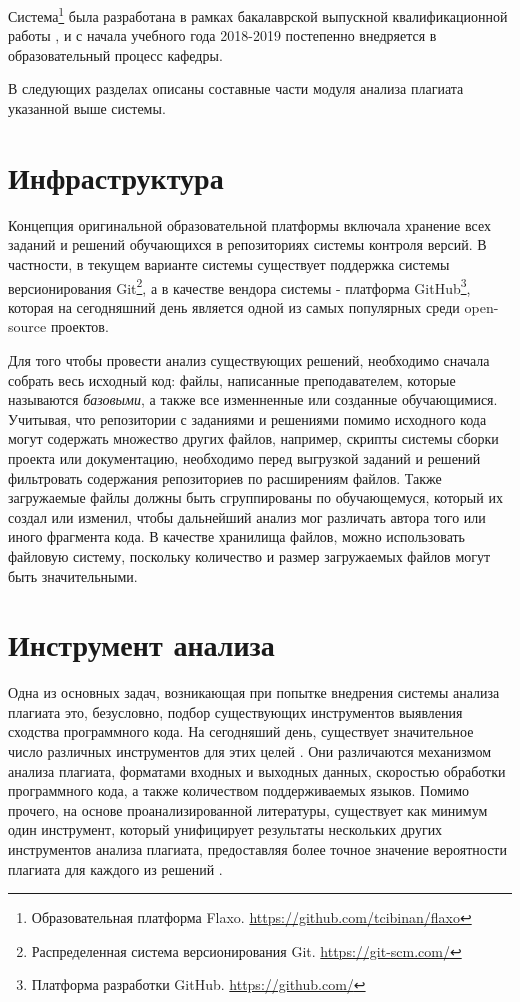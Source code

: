 \documentclass[a4paper,14pt]{extarticle}
\begin{document}
Система\footnote{Образовательная платформа Flaxo. \url{https://github.com/tcibinan/flaxo}} была разработана в рамках бакалаврской выпускной квалификационной работы \citep{flaxoThesis}, и с начала учебного года 2018-2019 постепенно внедряется в образовательный процесс кафедры.

В следующих разделах описаны составные части модуля анализа плагиата указанной выше системы.

\section{Инфраструктура}

Концепция оригинальной образовательной платформы включала хранение всех заданий и решений обучающихся в репозиториях системы контроля версий. В частности, в текущем варианте системы существует поддержка системы версионирования Git\footnote{Распределенная система версионирования Git. \url{https://git-scm.com/}}, а в качестве вендора системы - платформа GitHub\footnote{Платформа разработки GitHub. \url{https://github.com/}}, которая на сегодняшний день является одной из самых популярных среди open-source проектов.

Для того чтобы провести анализ существующих решений, необходимо сначала собрать весь исходный код: файлы, написанные преподавателем, которые называются \textit{базовыми}, а также все изменненные или созданные обучающимися. Учитывая, что репозитории с заданиями и решениями помимо исходного кода могут содержать множество других файлов, например, скрипты системы сборки проекта или документацию, необходимо перед выгрузкой заданий и решений фильтровать содержания репозиториев по расширениям файлов. Также загружаемые файлы должны быть сгруппированы по обучающемуся, который их создал или изменил, чтобы дальнейший анализ мог различать автора того или иного фрагмента кода. В качестве хранилища файлов, можно использовать файловую систему, поскольку количество и размер загружаемых файлов могут быть значительными.

\section{Инструмент анализа}

Одна из основных задач, возникающая при попытке внедрения системы анализа плагиата это, безусловно, подбор существующих инструментов выявления сходства программного кода. На сегодняший день, существует значительное число различных инструментов для этих целей \citep{plagiarismToolsSurvey}. Они различаются механизмом анализа плагиата, форматами входных и выходных данных, скоростью обработки программного кода, а также количеством поддерживаемых языков. Помимо прочего, на основе проанализированной литературы, существует как минимум один инструмент, который унифицирует результаты нескольких других инструментов анализа плагиата, предоставляя более точное значение вероятности плагиата для каждого из решений \citep{unifiedPlagiarismDetectionTool}.
\end{document}
